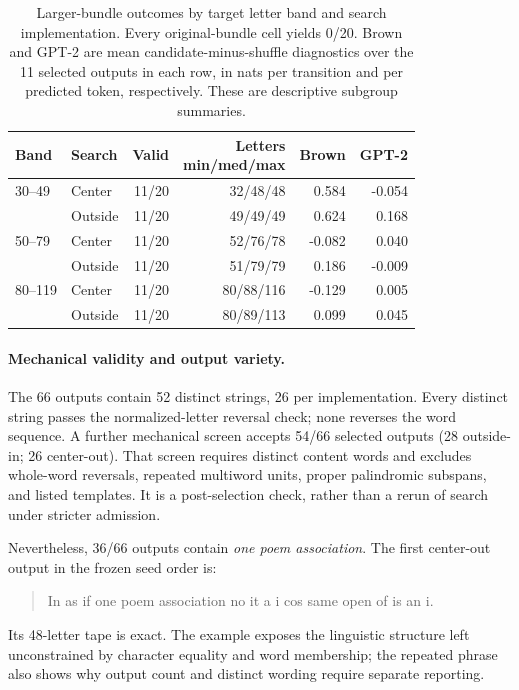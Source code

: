 \documentclass[11pt]{article}
\begin{document}
\begin{table}[t]
\centering
\small
\setlength{\tabcolsep}{2.5pt}
\begin{tabular}{@{}llrrrr@{}}
\toprule
Band & Search & Valid & \shortstack{Letters\\min/med/max} & Brown & GPT-2 \\
\midrule
30--49 & Center & 11/20 & 32/48/48 & 0.584 & -0.054 \\
       & Outside & 11/20 & 49/49/49 & 0.624 & 0.168 \\
50--79 & Center & 11/20 & 52/76/78 & -0.082 & 0.040 \\
       & Outside & 11/20 & 51/79/79 & 0.186 & -0.009 \\
80--119 & Center & 11/20 & 80/88/116 & -0.129 & 0.005 \\
        & Outside & 11/20 & 80/89/113 & 0.099 & 0.045 \\
\bottomrule
\end{tabular}
\caption{Larger-bundle outcomes by target letter band and search implementation. Every original-bundle cell yields 0/20. Brown and GPT-2 are mean candidate-minus-shuffle diagnostics over the 11 selected outputs in each row, in nats per transition and per predicted token, respectively. These are descriptive subgroup summaries.}
\label{tab:length}
\end{table}

\paragraph{Mechanical validity and output variety.}
The 66 outputs contain 52 distinct strings, 26 per implementation. Every distinct string passes the normalized-letter reversal check; none reverses the word sequence. A further mechanical screen accepts 54/66 selected outputs (28 outside-in; 26 center-out). That screen requires distinct content words and excludes whole-word reversals, repeated multiword units, proper palindromic subspans, and listed templates. It is a post-selection check, rather than a rerun of search under stricter admission.

Nevertheless, 36/66 outputs contain \emph{one poem association}. The first center-out output in the frozen seed order is:
\begin{quote}\small
In as if one poem association no it a i cos same open of is an i.
\end{quote}
Its 48-letter tape is exact. The example exposes the linguistic structure left unconstrained by character equality and word membership; the repeated phrase also shows why output count and distinct wording require separate reporting.
\end{document}
